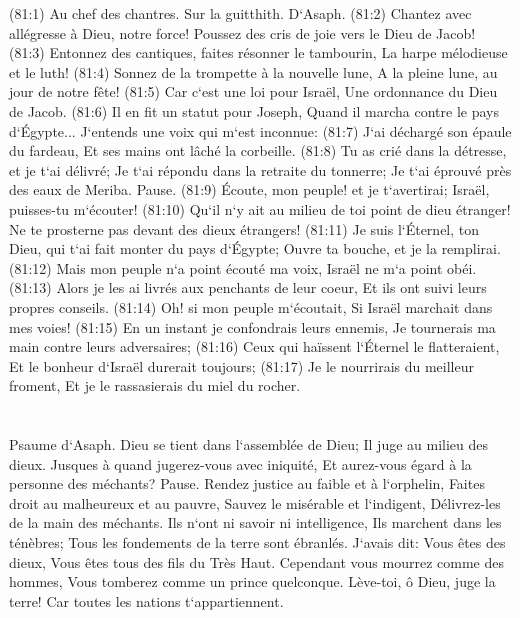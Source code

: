 \verse (81:1) Au chef des chantres. Sur la guitthith. D`Asaph. (81:2) Chantez avec allégresse à Dieu, notre force! Poussez des cris de joie vers le Dieu de Jacob! 
\verse (81:3) Entonnez des cantiques, faites résonner le tambourin, La harpe mélodieuse et le luth! 
\verse (81:4) Sonnez de la trompette à la nouvelle lune, A la pleine lune, au jour de notre fête! 
\verse (81:5) Car c`est une loi pour Israël, Une ordonnance du Dieu de Jacob. 
\verse (81:6) Il en fit un statut pour Joseph, Quand il marcha contre le pays d`Égypte... J`entends une voix qui m`est inconnue: 
\verse (81:7) J`ai déchargé son épaule du fardeau, Et ses mains ont lâché la corbeille. 
\verse (81:8) Tu as crié dans la détresse, et je t`ai délivré; Je t`ai répondu dans la retraite du tonnerre; Je t`ai éprouvé près des eaux de Meriba. Pause. 
\verse (81:9) Écoute, mon peuple! et je t`avertirai; Israël, puisses-tu m`écouter! 
\verse (81:10) Qu`il n`y ait au milieu de toi point de dieu étranger! Ne te prosterne pas devant des dieux étrangers! 
\verse (81:11) Je suis l`Éternel, ton Dieu, qui t`ai fait monter du pays d`Égypte; Ouvre ta bouche, et je la remplirai. 
\verse (81:12) Mais mon peuple n`a point écouté ma voix, Israël ne m`a point obéi. 
\verse (81:13) Alors je les ai livrés aux penchants de leur coeur, Et ils ont suivi leurs propres conseils. 
\verse (81:14) Oh! si mon peuple m`écoutait, Si Israël marchait dans mes voies! 
\verse (81:15) En un instant je confondrais leurs ennemis, Je tournerais ma main contre leurs adversaires; 
\verse (81:16) Ceux qui haïssent l`Éternel le flatteraient, Et le bonheur d`Israël durerait toujours; 
\verse (81:17) Je le nourrirais du meilleur froment, Et je le rassasierais du miel du rocher. 

\chapter{}

\verse Psaume d`Asaph. Dieu se tient dans l`assemblée de Dieu; Il juge au milieu des dieux. 
\verse Jusques à quand jugerez-vous avec iniquité, Et aurez-vous égard à la personne des méchants? Pause. 
\verse Rendez justice au faible et à l`orphelin, Faites droit au malheureux et au pauvre, 
\verse Sauvez le misérable et l`indigent, Délivrez-les de la main des méchants. 
\verse Ils n`ont ni savoir ni intelligence, Ils marchent dans les ténèbres; Tous les fondements de la terre sont ébranlés. 
\verse J`avais dit: Vous êtes des dieux, Vous êtes tous des fils du Très Haut. 
\verse Cependant vous mourrez comme des hommes, Vous tomberez comme un prince quelconque. 
\verse Lève-toi, ô Dieu, juge la terre! Car toutes les nations t`appartiennent. 

